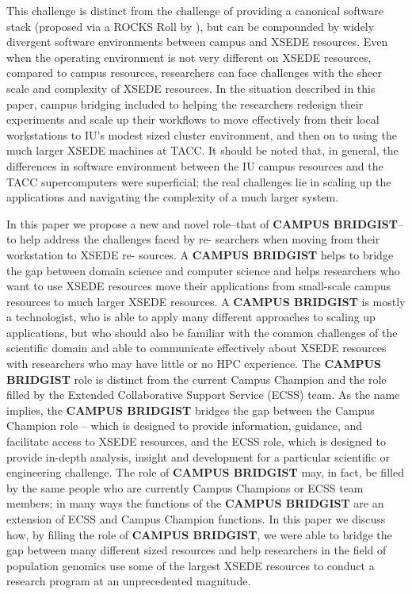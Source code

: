 \documentclass{sig-alternate}
\begin{document}
This challenge is distinct from the challenge of providing a canonical software stack (proposed via a ROCKS
Roll by \citeauthor{stewart2012}), but can be compounded by widely divergent software environments between
campus and XSEDE resources. Even when the operating environment is not very different on XSEDE resources,
compared to campus resources, researchers can face challenges with the sheer scale and complexity of XSEDE
resources. In the situation described in this paper, campus bridging included to helping the researchers
redesign their experiments and scale up their workflows to move effectively from their local workstations to IU's modest
sized cluster environment, and then on to using the much larger XSEDE machines at TACC. It should be
noted that, in general, the differences in software environment between the IU campus resources and the TACC
supercomputers were superficial; the real challenges lie in scaling up the applications and
navigating the complexity of a much larger system.



In this paper we propose a new and novel role--that of {\bf  CAMPUS
BRIDGIST}--to help address the challenges faced by re-
searchers when moving from their workstation to XSEDE re-
sources. A {\bf CAMPUS BRIDGIST} 
helps to bridge the gap between domain science and computer science and helps researchers who want to use
XSEDE resources move their applications from small-scale campus resources to much larger XSEDE resources. A
{\bf CAMPUS BRIDGIST} is mostly a technologist, who is able to apply many different approaches to scaling up
applications, but who should also be familiar with the common challenges of the scientific domain and 
able to communicate effectively about XSEDE resources with researchers who may have little or no HPC
experience. The {\bf CAMPUS BRIDGIST} role is distinct from the current Campus Champion and
the role filled by the Extended Collaborative Support Service (ECSS) team. As the name implies, the {\bf
  CAMPUS BRIDGIST} bridges the gap between the Campus Champion role -- which is designed to provide
information, guidance, and facilitate access to XSEDE resources, and the ECSS role, which is designed to
provide in-depth analysis, insight and development for a particular scientific or engineering challenge. The
role of {\bf CAMPUS BRIDGIST} may, in fact, be filled by the same people who are currently Campus Champions or
ECSS team members; in many ways the functions of the {\bf CAMPUS BRIDGIST} are an extension of
 ECSS and Campus Champion functions. In this paper we discuss how, by filling the role of
{\bf CAMPUS BRIDGIST}, we were able to bridge the gap between many different sized resources and help
researchers in the field of population genomics use some of the largest XSEDE resources to conduct a research
program at an unprecedented magnitude.
\end{document}
